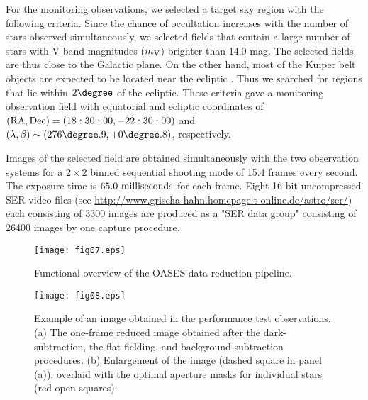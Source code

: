 \documentclass{pasj01}
\begin{document}
For the monitoring observations, 
we selected a target sky region with the following criteria.
Since the chance of occultation increases with the number of stars observed simultaneously,
we selected fields that contain a large number of stars 
with V-band magnitudes ($m_{\rm V}$) brighter than 14.0 mag.
The selected fields are thus close to the Galactic plane.
On the other hand, 
most of the Kuiper belt objects are expected to be located near the ecliptic \citep{elliot05}. 
Thus we searched for regions that lie within $2 \degree $ of the ecliptic.
These criteria gave a monitoring observation field with 
equatorial and ecliptic coordinates of
$({\rm RA, Dec}) = (18:30:00, -22:30:00)$ and $({\rm \lambda, \beta}) \sim (276 \degree .9, +0 \degree .8)$, respectively.

Images of the selected field are obtained simultaneously with the two observation systems
for a $2 \times 2$ binned sequential shooting mode of 15.4 frames every second. 
The exposure time is $65.0 \ {\rm milliseconds}$ for each frame.
Eight 16-bit uncompressed SER video files (see \url{http://www.grischa-hahn.homepage.t-online.de/astro/ser/}) 
each consisting of 3300 images are produced as a "SER data group" consisting of 26400 images by one capture procedure.


\begin{figure}[!pt]
\begin{center}
   \texttt{[image: fig07.eps]}
\caption{Functional overview of the OASES data reduction pipeline. }
   \label{fig43}
 \end{center}
\end{figure}


\begin{figure}[!pt]
\begin{center}
   \texttt{[image: fig08.eps]}
   \caption{Example of an image obtained in the performance test observations.
   (a) The one-frame reduced image obtained after the dark-subtraction, the flat-fielding, 
   and background subtraction procedures. 
   (b) Enlargement of the image (dashed square in panel (a)), 
   overlaid with the optimal aperture masks for individual stars (red open squares).}
   \label{fig42}
 \end{center}
\end{figure}
\end{document}
